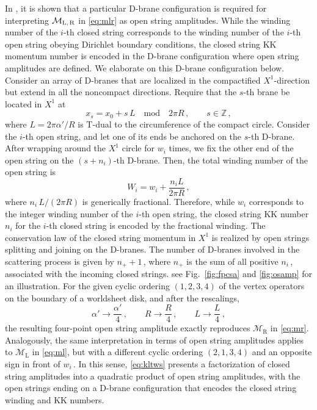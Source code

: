 \documentclass[11pt]{article}
\newcommand{\be}{\begin{equation}}
\newcommand{\ee}{\end{equation}}
\newcommand{\CM}{\mathcal{M}}
\begin{document}
In \cite{Gomis:2021ire},  it is shown that a particular D-brane configuration is required for interpreting $\CM_\text{L,\,R}$ in \eqref{eq:mlr} as open string amplitudes. While the winding number of the $i$-th closed string corresponds to the winding number of the $i$-th open string obeying Dirichlet boundary conditions, the closed string KK momentum number is encoded in the D-brane configuration where open string amplitudes are defined. We elaborate on this D-brane configuration below.
%
Consider an array of D-branes that are localized in the compactified $X^1$-direction but extend in all the noncompact directions. Require that the $s$-th brane be located in $X^1$ at 
%
\be
    x_s = x_0 + s \, L \quad \text{mod} \quad 2\pi R\,,
        \qquad
    s \in \mathbb{Z}\,,
\ee
%
where $L = 2 \pi {\alpha}{}' / R$ is T-dual to the circumference of the compact circle. Consider the $i$-th open string, and let one of its ends be anchored on the $s$-th D-brane. After wrapping around the $X^1$ circle for $w_i$ times, we fix the other end of the open string on the $(s+n_i)$-th D-brane. Then, the total winding number of the open string is
%
\be \label{eq:twn}
    W_i = w_i + \frac{n_i L}{2\pi R}\,,
\ee
%
where $n_i \, L / (2\pi R)$ is generically fractional. Therefore, while $w_i$ corresponds to the integer winding number of the $i$-th open string, the closed string KK number $n_i$ for the $i$-th closed string is encoded by the fractional winding. The conservation law of the closed string momentum in $X^1$ is realized by open strings splitting and joining on the D-branes. The number of D-branes involved in the scattering process is given by $n_+ + 1$\,, where $n_+$ is the sum of all positive $n_i$\,, associated with the incoming closed strings. 
%
%
see Fig.~\ref{fig:fpcsa} and \ref{fig:osamp} for an illustration.
%
%
For the given cyclic ordering $(1,2,3,4)$ of the vertex operators on the boundary of a worldsheet disk, and after the rescalings, 
%
\be \label{eq:rs}
    {\alpha}{}' \rightarrow \frac{{\alpha}{}'}{4}\,,
        \qquad%
    R \rightarrow \frac{R}{4}\,,
        \qquad%
    L \rightarrow \frac{L}{4}\,,
\ee
%
the resulting four-point open string amplitude exactly reproduces $\CM_\text{R}$ in \eqref{eq:mr}. Analogously, the same interpretation in terms of open string amplitudes applies to $\CM_\text{L}$ in \eqref{eq:ml}, but with a different cyclic ordering $(2,1,3,4)$ and an opposite sign in front of $w_i$\,. In this sense, \eqref{eq:kltws} presents a factorization of closed string amplitudes into a quadratic product of open string amplitudes, with the open strings ending on a D-brane configuration that encodes the closed string winding and KK numbers. 
\end{document}
